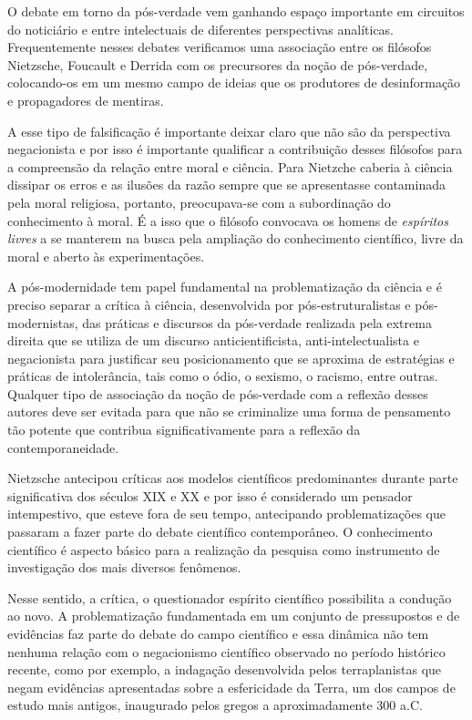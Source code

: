 O debate em torno da pós-verdade vem ganhando espaço importante em
circuitos do noticiário e entre intelectuais de diferentes perspectivas
analíticas. Frequentemente nesses debates verificamos uma associação
entre os filósofos Nietzsche, Foucault e Derrida com os precursores da
noção de pós-verdade, colocando-os em um mesmo campo de ideias que os
produtores de desinformação e propagadores de mentiras.

A esse tipo de falsificação é importante deixar claro que não
são da perspectiva negacionista e por isso é importante qualificar a
contribuição desses filósofos para a compreensão da relação entre moral
e ciência. Para Nietzche caberia à ciência dissipar os erros e as
ilusões da razão sempre que se apresentasse contaminada pela moral
religiosa, portanto, preocupava-se com a subordinação do conhecimento à
moral. É a isso que o filósofo convocava os homens de \emph{espíritos
livres} a se manterem na busca pela ampliação do conhecimento
científico, livre da moral e aberto às experimentações.

A pós-modernidade tem papel fundamental na problematização da ciência e
é preciso separar a crítica à ciência, desenvolvida por
pós-estruturalistas e pós-modernistas, das práticas e discursos da
pós-verdade realizada pela extrema direita que se utiliza de um discurso
anticientificista, anti-intelectualista e negacionista para justificar
seu posicionamento que se aproxima de estratégias e práticas de
intolerância, tais como o ódio, o sexismo, o racismo, entre outras.
Qualquer tipo de associação da noção de pós-verdade com a reflexão
desses autores deve ser evitada para que não se criminalize uma forma de
pensamento tão potente que contribua significativamente para a reflexão
da contemporaneidade.

Nietzsche antecipou críticas aos modelos científicos
predominantes durante parte significativa dos séculos XIX e XX e por
isso é considerado um pensador intempestivo, que esteve fora de seu
tempo, antecipando problematizações que passaram a fazer parte do debate
científico contemporâneo. O conhecimento científico é aspecto básico
para a realização da pesquisa como instrumento de investigação dos mais
diversos fenômenos.

Nesse sentido, a crítica, o questionador espírito científico
possibilita a condução ao novo. A problematização fundamentada em um
conjunto de pressupostos e de evidências faz parte do debate do campo
científico e essa dinâmica não tem nenhuma relação com o negacionismo
científico observado no período histórico recente, como por exemplo, a
indagação desenvolvida pelos terraplanistas que negam evidências
apresentadas sobre a esfericidade da Terra, um dos campos de estudo mais
antigos, inaugurado pelos gregos a aproximadamente 300 a.C.

